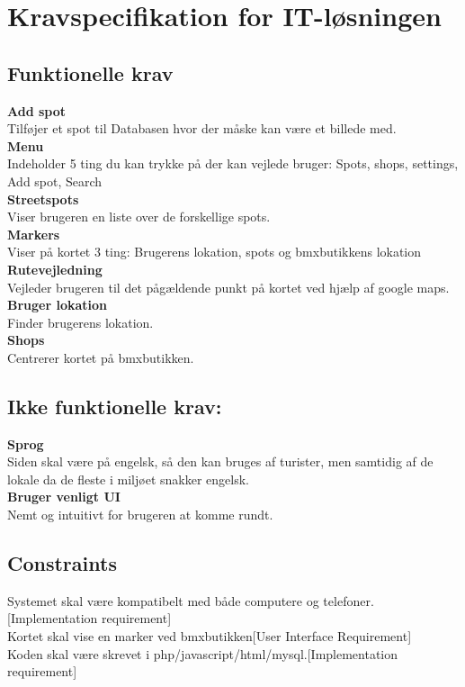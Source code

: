 \documentclass[12pt]{article}
\begin{document}
\pagebreak

\section{Kravspecifikation for IT-løsningen}
\subsection*{Funktionelle krav}
\textbf{Add spot} \\ Tilføjer et spot til Databasen hvor der måske kan være et billede med.\\
\textbf{Menu}\\ Indeholder 5 ting du kan trykke på der kan vejlede bruger: Spots, shops, settings, Add spot, Search\\
\textbf{Streetspots}\\ Viser brugeren en liste over de forskellige spots.\\
\textbf{Markers}\\ Viser på kortet 3 ting: Brugerens lokation, spots og bmxbutikkens lokation\\
\textbf{Rutevejledning}\\ Vejleder brugeren til det pågældende punkt på kortet ved hjælp af google maps.\\
\textbf{Bruger lokation}\\ Finder brugerens lokation.\\
\textbf{Shops}\\ Centrerer kortet på bmxbutikken.
\subsection*{Ikke funktionelle krav:}
\textbf{Sprog}\\ Siden skal være på engelsk, så den kan bruges af turister, men samtidig af de lokale da de fleste i miljøet snakker engelsk.\\
\textbf{Bruger venligt UI}\\ Nemt og intuitivt for brugeren at komme rundt.\\
\subsection*{Constraints}
Systemet skal være kompatibelt med både computere og telefoner.[Implementation requirement]\\
Kortet skal vise en marker ved bmxbutikken[User Interface Requirement]\\
Koden skal være skrevet i php/javascript/html/mysql.[Implementation requirement]\\
\pagebreak\\
\end{document}
